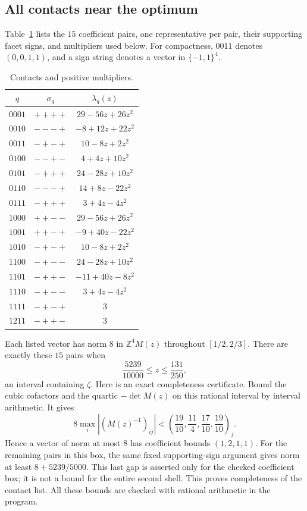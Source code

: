 \documentclass[11pt,reqno]{amsart}
\theoremstyle{definition}
\newcommand{\Z}{\mathbb Z}
\begin{document}
\subsection{All contacts near the optimum}
Table~\ref{tab:contacts} lists the $15$ coefficient pairs, one representative
per pair, their supporting facet signs, and multipliers used below.
For compactness, $0011$ denotes $(0,0,1,1)$, and a sign string denotes a
vector in $\{-1,1\}^4$.

\begin{table}[ht]
\centering
\caption{Contacts and positive multipliers.}\label{tab:contacts}
\begin{tabular}{ccc}
\toprule
$q$&$\sigma_q$&$\lambda_q(z)$\\
\midrule
$0001$&$++++$&$29-56z+26z^2$\\
$0010$&$---+$&$-8+12z+22z^2$\\
$0011$&$-+-+$&$10-8z+2z^2$\\
$0100$&$--+-$&$4+4z+10z^2$\\
$0101$&$-+++$&$24-28z+10z^2$\\
$0110$&$---+$&$14+8z-22z^2$\\
$0111$&$-+++$&$3+4z-4z^2$\\
$1000$&$++--$&$29-56z+26z^2$\\
$1001$&$++-+$&$-9+40z-22z^2$\\
$1010$&$-+-+$&$10-8z+2z^2$\\
$1100$&$-+--$&$24-28z+10z^2$\\
$1101$&$-++-$&$-11+40z-8z^2$\\
$1110$&$-+--$&$3+4z-4z^2$\\
$1111$&$-+-+$&$3$\\
$1211$&$-++-$&$3$\\
\bottomrule
\end{tabular}
\end{table}

Each listed vector has norm $8$ in $\Z^4M(z)$ throughout $[1/2,2/3]$.
There are exactly these $15$ pairs when
\begin{equation}\label{eq:root-interval}
 \frac{5239}{10000}\le z\le\frac{131}{250},
\end{equation}
an interval containing $\zeta$. Here is an exact completeness certificate.
Bound the cubic cofactors and the quartic $-\det M(z)$ on this rational
interval by interval arithmetic. It gives
\[
 8\max_i|(M(z)^{-1})_{ij}|<
 \left(\frac{19}{10},\frac{11}{4},\frac{17}{10},\frac{19}{10}\right)_j.
\]
Hence a vector of norm at most $8$ has coefficient bounds $(1,2,1,1)$.
For the remaining pairs in this box, the same fixed supporting-sign
argument gives norm at least $8+5239/5000$. This last gap is asserted
only for the checked coefficient box; it is not a bound for the entire
second shell. This proves completeness of the contact list. All these
bounds are checked with rational arithmetic in the program.
\end{document}
